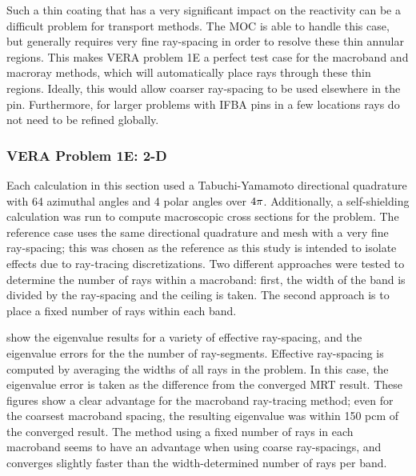 {{{      Such a thin coating that has a very significant impact on the reactivity can be a difficult problem for transport methods.
      The \ac{MOC} is able to handle this case, but generally requires very fine ray-spacing in order to resolve these thin annular regions.
      This makes \ac{VERA} problem 1E a perfect test case for the macroband and macroray methods, which will automatically place rays through these thin regions.
      Ideally, this would allow coarser ray-spacing to be used elsewhere in the pin.
      Furthermore, for larger problems with \ac{IFBA} pins in a few locations rays do not need to be refined globally.

      \subsubsection{VERA Problem 1E: 2-D}{\label{sssec:MR:1E:2-D}
        Each calculation in this section used a Tabuchi-Yamamoto \cite{TabuchiYamamotoQuad} directional quadrature with 64 azimuthal angles and 4 polar angles over $4\pi$.
        Additionally, a self-shielding calculation was run to compute macroscopic cross sections for the problem.
        The reference case uses the same directional quadrature and mesh with a very fine ray-spacing; this was chosen as the reference as this study is intended to isolate effects due to ray-tracing discretizations.
        Two different approaches were tested to determine the number of rays within a macroband: first, the width of the band is divided by the ray-spacing and the ceiling is taken.
        The second approach is to place a fixed number of rays within each band.

         show the eigenvalue results for a variety of effective ray-spacing, and the eigenvalue errors for the the number of ray-segments.
        Effective ray-spacing is computed by averaging the widths of all rays in the problem.
        In this case, the eigenvalue error is taken as the difference from the converged \ac{MRT} result.
        These figures show a clear advantage for the macroband ray-tracing method;
          even for the coarsest macroband spacing, the resulting eigenvalue was within 150 pcm of the converged result.
        The method using a fixed number of rays in each macroband seems to have an advantage when using coarse ray-spacings, and converges slightly faster than the width-determined number of rays per band.

}}}}
